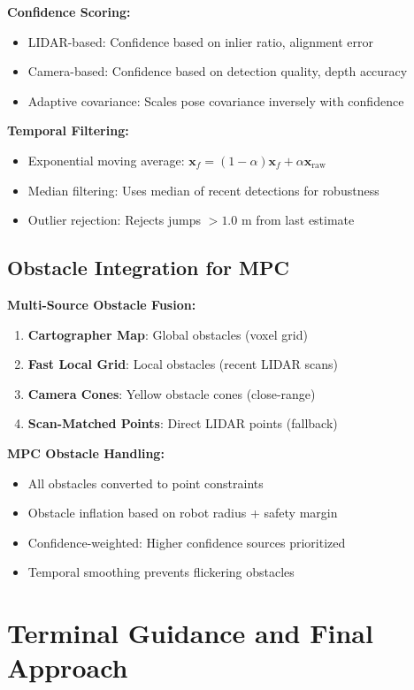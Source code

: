 \documentclass[11pt]{article}
\begin{document}
\textbf{Confidence Scoring:}
\begin{itemize}
    \item LIDAR-based: Confidence based on inlier ratio, alignment error
    \item Camera-based: Confidence based on detection quality, depth accuracy
    \item Adaptive covariance: Scales pose covariance inversely with confidence
\end{itemize}

\textbf{Temporal Filtering:}
\begin{itemize}
    \item Exponential moving average: $\mathbf{x}_f = (1-\alpha)\mathbf{x}_f + \alpha \mathbf{x}_{\text{raw}}$
    \item Median filtering: Uses median of recent detections for robustness
    \item Outlier rejection: Rejects jumps $> 1.0$ m from last estimate
\end{itemize}

\subsection{Obstacle Integration for MPC}

\textbf{Multi-Source Obstacle Fusion:}
\begin{enumerate}
    \item \textbf{Cartographer Map}: Global obstacles (voxel grid)
    \item \textbf{Fast Local Grid}: Local obstacles (recent LIDAR scans)
    \item \textbf{Camera Cones}: Yellow obstacle cones (close-range)
    \item \textbf{Scan-Matched Points}: Direct LIDAR points (fallback)
\end{enumerate}

\textbf{MPC Obstacle Handling:}
\begin{itemize}
    \item All obstacles converted to point constraints
    \item Obstacle inflation based on robot radius + safety margin
    \item Confidence-weighted: Higher confidence sources prioritized
    \item Temporal smoothing prevents flickering obstacles
\end{itemize}

\section{Terminal Guidance and Final Approach}
\end{document}
